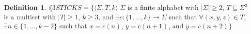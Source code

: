 \documentclass{article}
\theoremstyle{definition} \newtheorem{definition}[definition]{Definition}
\newcommand{\triple}[3]{\langle#1,#2,#3\rangle} %
\begin{document}
  \begin{definition}
    $\lang{3STICKS}=\{\triple{\Sigma}{T}{k}|\Sigma$ is a finite alphabet with
    $|\Sigma|\geq2$, $T\subseteq\Sigma^3$ is a multiset with $|T|\geq1$, $k\geq
    3$, and $\exists c\colon \{1,\ldots,k\}\to\Sigma$ such that
    $\forall(x,y,z)\in T$, $\exists n\in\{1,\ldots,k-2\}$ such that $x=c(n)$,
    $y=c(n+1)$, and $y=c(n+2)\}$
  \end{definition}
\end{document}
